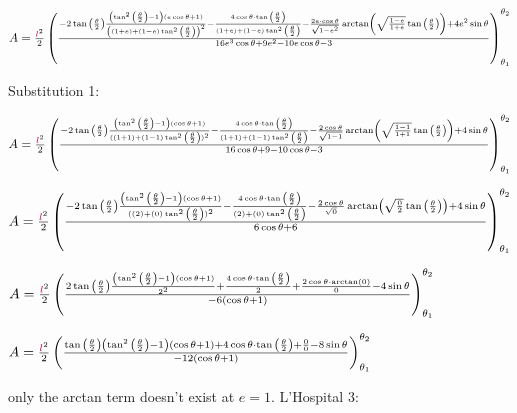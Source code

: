 \begin{flushleft}
$A=\frac{\textcolor{purple}{l}^2}{2}\left(
\frac{-2\tan{\left(\frac{\theta}{2}\right)}\frac{\left(\tan^2{\left(\frac{\theta}{2}\right)}-1\right)(\textcolor{black}{e}\cos{\theta}+1)}{\left((1+\textcolor{black}{e})+(1-\textcolor{black}{e})\tan^2{\left(\frac{\theta}{2}\right)}\right)^2}
-\frac{4\cos{\theta}\cdot\tan{\left(\frac{\theta}{2}\right)}}{(1+\textcolor{black}{e})+(1-\textcolor{black}{e})\tan^2{\left(\frac{\theta}{2}\right)}}
-\frac{2\textcolor{black}{e}\cdot\cos{\theta}}{\sqrt{1-\textcolor{black}{e}^2}}\arctan\left(\sqrt{\frac{1-\textcolor{black}{e}}{1+\textcolor{black}{e}}}\tan{\left(\frac{\theta}{2}\right)}\right)
+4\textcolor{black}{e}^2\sin{\theta}}
{16\textcolor{black}{e}^3\cos{\theta}+9\textcolor{black}{e}^2-10\textcolor{black}{e}\cos{\theta}-3}
\right)_{\theta_1}^{\theta_2}$

\bigskip
\normalsize
Substitution 1:
\scriptsize
\bigskip


$A=\frac{\textcolor{purple}{l}^2}{2}\left(
\frac{-2\tan{\left(\frac{\theta}{2}\right)}\frac{\left(\tan^2{\left(\frac{\theta}{2}\right)}-1\right)(\cos{\theta}+1)}{((1+1)+(1-1)\tan^2{\left(\frac{\theta}{2}\right)})^2}
-\frac{4\cos{\theta}\cdot\tan{\left(\frac{\theta}{2}\right)}}{(1+1)+(1-1)\tan^2{\left(\frac{\theta}{2}\right)}}
-\frac{2\cos{\theta}}{\sqrt{1-1}}\arctan\left(\sqrt{\frac{1-1}{1+1}}\tan{\left(\frac{\theta}{2}\right)}\right)
+4\sin{\theta}}
{16\cos{\theta}+9-10\cos{\theta}-3}
\right)_{\theta_1}^{\theta_2}$

$A=\frac{\textcolor{purple}{l}^2}{2}\left(
\frac{-2\tan{\left(\frac{\theta}{2}\right)}\frac{\left(\tan^2{\left(\frac{\theta}{2}\right)}-1\right)(\cos{\theta}+1)}{((2)+(0)\tan^2{\left(\frac{\theta}{2}\right)})^2}
-\frac{4\cos{\theta}\cdot\tan{\left(\frac{\theta}{2}\right)}}{(2)+(0)\tan^2{\left(\frac{\theta}{2}\right)}}
-\frac{2\cos{\theta}}{\sqrt{0}}\arctan\left(\sqrt{\frac{0}{2}}\tan{\left(\frac{\theta}{2}\right)}\right)
+4\sin{\theta}}
{6\cos{\theta}+6}
\right)_{\theta_1}^{\theta_2}$

$A=\frac{\textcolor{purple}{l}^2}{2}\left(
\frac{2\tan{\left(\frac{\theta}{2}\right)}\frac{\left(\tan^2{\left(\frac{\theta}{2}\right)}-1\right)(\cos{\theta}+1)}{2^2}
+\frac{4\cos{\theta}\cdot\tan{\left(\frac{\theta}{2}\right)}}{2}
+\frac{2\cos{\theta}\cdot\arctan(0)}{0}
-4\sin{\theta}}
{-6(\cos{\theta}+1)}
\right)_{\theta_1}^{\theta_2}$

$A=\frac{\textcolor{purple}{l}^2}{2}\left(
\frac{\tan{\left(\frac{\theta}{2}\right)}\left(\tan^2{\left(\frac{\theta}{2}\right)}-1\right)(\cos{\theta}+1)
+4\cos{\theta}\cdot\tan{\left(\frac{\theta}{2}\right)}
+\frac{0}{0}
-8\sin{\theta}}
{-12(\cos{\theta}+1)}
\right)_{\theta_1}^{\theta_2}$


\bigskip
\normalsize
only the arctan term doesn't exist at $e=1$.
L'Hospital 3:
\scriptsize
\bigskip


\end{flushleft}
